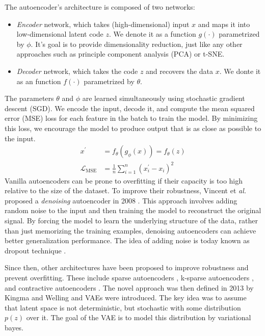 The autoencoder's architecture is composed of two networks:
\begin{itemize}
    \item \textit{Encoder} network, which takes (high-dimensional) input $x$ and maps it into low-dimensional latent code $z$. We denote it as a
    function $g(\cdot)$ parametrized by $\phi$. It's goal is to provide dimensionality reduction, just like 
    any other approaches such as principle component analysis (PCA) or t-SNE. 
    \item \textit{Decoder} network, which takes the code $z$ and recovers the data $x$. We donte it as an function $f(\cdot)$ parametrized by $\theta$.
\end{itemize}
The parameters $\theta$ and $\phi$ are learned simultaneously using stochastic gradient descent (SGD). We encode the input, decode it, and
compute the mean squared error (MSE) loss for each feature in the batch to train the model. By minimizing this loss, we encourage the model
to produce output that is as close as possible to the input.
\begin{align*}
    x^\prime &= f_\theta(g_\phi(x)) = f_\theta(z) \\
    \mathcal{L}_{\text{MSE}} &= \frac{1}{n} \sum_{i=1}^{n} (x^{\prime}_i - x_i)^2
\end{align*}
Vanilla autoencoders can be prone to overfitting if their capacity is too high relative to the size of the dataset. To improve their
robustness, Vincent et \textit{al.} proposed a \textit{denoising} autoencoder in 2008 \cite{denoising-ae-2008}. This approach involves adding
random noise to the input and then training the model to reconstruct the original signal. By forcing the model to learn the underlying
structure of the data, rather than just memorizing the training examples, denoising autoencoders can achieve better generalization 
performance. The idea of adding noise is today known as dropout technique \cite{dropout-2014}. 

Since then, other architectures have been proposed to improve robustness and prevent overfitting. These include sparse autoencoders
\cite{sparse-ae-2011}, k-sparse autoencoders \cite{ksparse-ae-2014}, and contractive autoencoders \cite{contractive-ae-2011}. The novel 
approach was then defined in 2013 by Kingma and Welling \cite{vae-original-2013} and VAEs were introduced. The key idea was to assume that 
latent space is not deterministic, but stochastic with some distribution $p(z)$ over it. The goal of the VAE is to model this 
distribution by variational bayes. 

